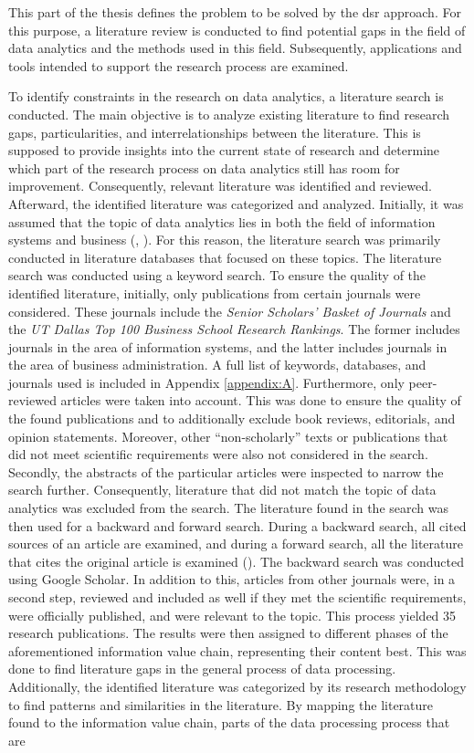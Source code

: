 This part of the thesis defines the problem to be solved by the \ac{dsr} approach. For this purpose, a literature review is conducted to find potential gaps in the field of data analytics and the methods used in this field. Subsequently, applications and tools intended to support the research process are examined.

To identify constraints in the research on data analytics, a literature search is conducted. The main objective is to analyze existing literature to find research gaps, particularities, and interrelationships between the literature. This is supposed to provide insights into the current state of research and determine which part of the research process on data analytics still has room for improvement. Consequently, relevant literature was identified and reviewed. Afterward, the identified literature was categorized and analyzed. Initially, it was assumed that the topic of data analytics lies in both the field of information systems and business (\cite{Abbasi.2016}, \cite{Levina.2005}). For this reason, the literature search was primarily conducted in literature databases that focused on these topics. The literature search was conducted using a keyword search. To ensure the quality of the identified literature, initially, only publications from certain journals were considered. These journals include the \textit{Senior Scholars' Basket of Journals} and the \textit{UT Dallas Top 100 Business School Research Rankings}. The former includes journals in the area of information systems, and the latter includes journals in the area of business administration. A full list of keywords, databases, and journals used is included in Appendix \ref{appendix:A}. Furthermore, only peer-reviewed articles were taken into account. This was done to ensure the quality of the found publications and to additionally exclude book reviews, editorials, and opinion statements. Moreover, other \enquote{non-scholarly} texts or publications that did not meet scientific requirements were also not considered in the search. Secondly, the abstracts of the particular articles were inspected to narrow the search further. Consequently, literature that did not match the topic of data analytics was excluded from the search. The literature found in the search was then used for a backward and forward search. During a backward search, all cited sources of an article are examined, and during a forward search, all the literature that cites the original article is examined (\cite{Webster.2002}). The backward search was conducted using Google Scholar. In addition to this, articles from other journals were, in a second step, reviewed and included as well if they met the scientific requirements, were officially published, and were relevant to the topic. This process yielded 35 research publications. The results were then assigned to different phases of the aforementioned information value chain, representing their content best. This was done to find literature gaps in the general process of data processing. Additionally, the identified literature was categorized by its research methodology to find patterns and similarities in the literature. By mapping the literature found to the information value chain, parts of the data processing process that are 